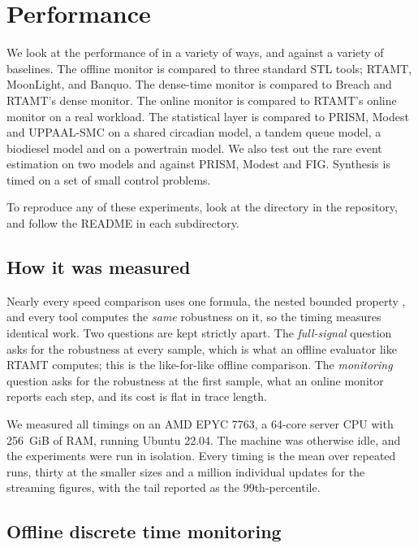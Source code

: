 \chapter{Performance}
\label{ch:performance}

We look at the performance of \sentil{} in a variety of ways, and against a variety of baselines. The offline monitor is compared to three standard STL tools; RTAMT, MoonLight, and Banquo. The dense-time monitor is compared to Breach and RTAMT's dense monitor. The online monitor is compared to RTAMT's online monitor on a real workload. The statistical layer is compared to PRISM, Modest and UPPAAL-SMC on a shared circadian model, a tandem queue model, a biodiesel model and on a powertrain model. We also test out the rare event estimation on two models and against PRISM, Modest and FIG. Synthesis is timed on a set of small control problems.

To reproduce any of these experiments, look at the  directory in the repository, and follow the README in each subdirectory.

\section{How it was measured}

Nearly every speed comparison uses one formula, the nested bounded property , and every tool computes the \emph{same} robustness on it, so the timing measures identical work. Two questions are kept strictly apart. The \emph{full-signal} question asks for the robustness at every sample, which is what an offline evaluator like RTAMT computes; this is the like-for-like offline comparison. The \emph{monitoring} question asks for the robustness at the first sample, what an online monitor reports each step, and its cost is flat in trace length.

We measured all timings on an AMD EPYC 7763, a 64-core server CPU with 256~GiB of RAM, running Ubuntu 22.04. The machine was otherwise idle, and the experiments were run in isolation. Every timing is the mean over repeated runs, thirty at the smaller sizes and a million individual updates for the streaming figures, with the tail reported as the 99th-percentile.

\section{Offline discrete time monitoring}

